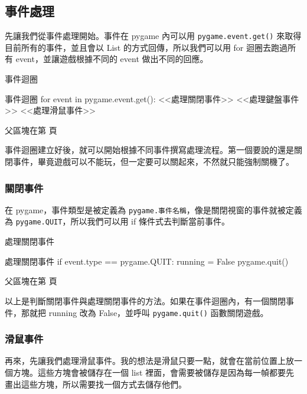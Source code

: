 \documentclass[12pt, a4paper]{siweb}
\begin{document}
\subsection{事件處理}

先讓我們從事件處理開始。事件在 pygame 內可以用 \verb|pygame.event.get()| 來取得目前所有的事件，並且會以 List 的方式回傳，所以我們可以用 for 迴圈去跑過所有 event，並讓遊戲根據不同的 event 做出不同的回應。

\begin{siweb}{事件迴圈}
\begin{mylisting}{事件迴圈}
for event in pygame.event.get():
	<<處理關閉事件>>
	<<處理鍵盤事件>>
	<<處理滑鼠事件>>
\end{mylisting}
\label{事件迴圈_0}\label{處理關閉事件_father}\label{處理鍵盤事件_father}\label{處理滑鼠事件_father}
父區塊在第\pageref{事件迴圈_father} 頁
\end{siweb}

事件迴圈建立好後，就可以開始根據不同事件撰寫處理流程。第一個要說的還是關閉事件，畢竟遊戲可以不能玩，但一定要可以關起來，不然就只能強制關機了。

\subsubsection{關閉事件}

在 pygame，事件類型是被定義為 \verb|pygame.事件名稱|，像是關閉視窗的事件就被定義為 \verb|pygame.QUIT|，所以我們可以用 if 條件式去判斷當前事件。

\begin{siweb}{處理關閉事件}
\begin{mylisting}{處理關閉事件}
if event.type == pygame.QUIT:
	running = False
	pygame.quit()
\end{mylisting}
\label{處理關閉事件_0}
父區塊在第\pageref{處理關閉事件_father} 頁
\end{siweb}

以上是判斷關閉事件與處理關閉事件的方法。如果在事件迴圈內，有一個關閉事件，那就把 running 改為 False，並呼叫 \verb|pygame.quit()| 函數關閉遊戲。

\subsubsection{滑鼠事件}

再來，先讓我們處理滑鼠事件。我的想法是滑鼠只要一點，就會在當前位置上放一個方塊。這些方塊會被儲存在一個 list 裡面，會需要被儲存是因為每一幀都要先畫出這些方塊，所以需要找一個方式去儲存他們。
\end{document}
